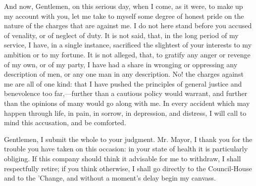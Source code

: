 And now, Gentlemen, on this serious day, when I come, as it were, to make up my account with you, let me take to myself some degree of honest pride on the nature of the charges that are against me. I do not here stand before you accused of venality, or of neglect of duty. It is not said, that, in the long period of my service, I have, in a single instance, sacrificed the slightest of your interests to my ambition or to my fortune. It is not alleged, that, to gratify any anger or revenge of my own, or of my party, I have had a share in wronging or oppressing any description of men, or any one man in any description. No! the charges against me are all of one kind: that I have pushed the principles of general justice and benevolence too far,—further than a cautious policy would warrant, and further than the opinions of many would go along with me. In every accident which may happen through life, in pain, in sorrow, in depression, and distress, I will call to mind this accusation, and be comforted.

Gentlemen, I submit the whole to your judgment. Mr. Mayor, I thank you for the trouble you have taken on this occasion: in your state of health it is particularly obliging. If this company should think it advisable for me to withdraw, I shall respectfully retire; if you think otherwise, I shall go directly to the Council-House and to the 'Change, and without a moment's delay begin my canvass.

\PRLsep

